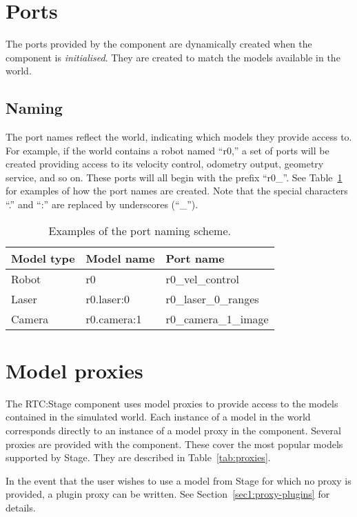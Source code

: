 \documentclass[a4paper,10pt]{article}
\begin{document}
\section{Ports}
\label{sec:port}

The ports provided by the component are dynamically created when the component
is \emph{initialised}. They are created to match the models available in the
world.

\subsection{Naming}
\label{sec1:naming}

The port names reflect the world, indicating which models they provide access
to. For example, if the world contains a robot named ``r0,'' a set of ports
will be created providing access to its velocity control, odometry output,
geometry service, and so on. These ports will all begin with the prefix
``r0\_''. See Table~\ref{tab:port_naming} for examples of how the port names are
created. Note that the special characters ``.'' and ``:'' are replaced by
underscores (``\_'').

\begin{table}[t]
  \centering
  \begin{tabular}{lll}
    \toprule
    Model type & Model name & Port name \\
    \midrule
    Robot & r0 & r0\_vel\_control \\
    Laser & r0.laser:0 & r0\_laser\_0\_ranges \\
    Camera & r0.camera:1 & r0\_camera\_1\_image \\
    \bottomrule
  \end{tabular}
  \caption{Examples of the port naming scheme.}
  \label{tab:port_naming}
\end{table}

\section{Model proxies}
\label{sec:model-proxies}

The RTC:Stage component uses model proxies to provide access to the models
contained in the simulated world. Each instance of a model in the world
corresponds directly to an instance of a model proxy in the component. Several
proxies are provided with the component. These cover the most popular models
supported by Stage. They are described in Table~\ref{tab:proxies}.

In the event that the user wishes to use a model from Stage for which no proxy
is provided, a plugin proxy can be written. See
Section~\ref{sec1:proxy-plugins} for details.
\end{document}
